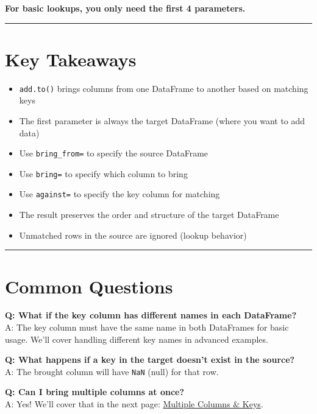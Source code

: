 \documentclass[
  letterpaper,
]{scrbook}
\providecommand{\tightlist}{%
  \setlength{\itemsep}{0pt}\setlength{\parskip}{0pt}}
\begin{document}
\textbf{For basic lookups, you only need the first 4 parameters.}

\begin{center}\rule{0.5\linewidth}{0.5pt}\end{center}

\section{Key Takeaways}\label{key-takeaways}

\begin{itemize}
\tightlist
\item
  \texttt{add.to()} brings columns from one DataFrame to another based
  on matching keys
\item
  The first parameter is always the target DataFrame (where you want to
  add data)
\item
  Use \texttt{bring\_from=} to specify the source DataFrame
\item
  Use \texttt{bring=} to specify which column to bring
\item
  Use \texttt{against=} to specify the key column for matching
\item
  The result preserves the order and structure of the target DataFrame
\item
  Unmatched rows in the source are ignored (lookup behavior)
\end{itemize}

\begin{center}\rule{0.5\linewidth}{0.5pt}\end{center}

\section{Common Questions}\label{common-questions}

\textbf{Q: What if the key column has different names in each
DataFrame?}\\
A: The key column must have the same name in both DataFrames for basic
usage. We'll cover handling different key names in advanced examples.

\textbf{Q: What happens if a key in the target doesn't exist in the
source?}\\
A: The brought column will have \texttt{NaN} (null) for that row.

\textbf{Q: Can I bring multiple columns at once?}\\
A: Yes! We'll cover that in the next page:
\href{examples-to-02-multiple.html}{Multiple Columns \& Keys}.
\end{document}
